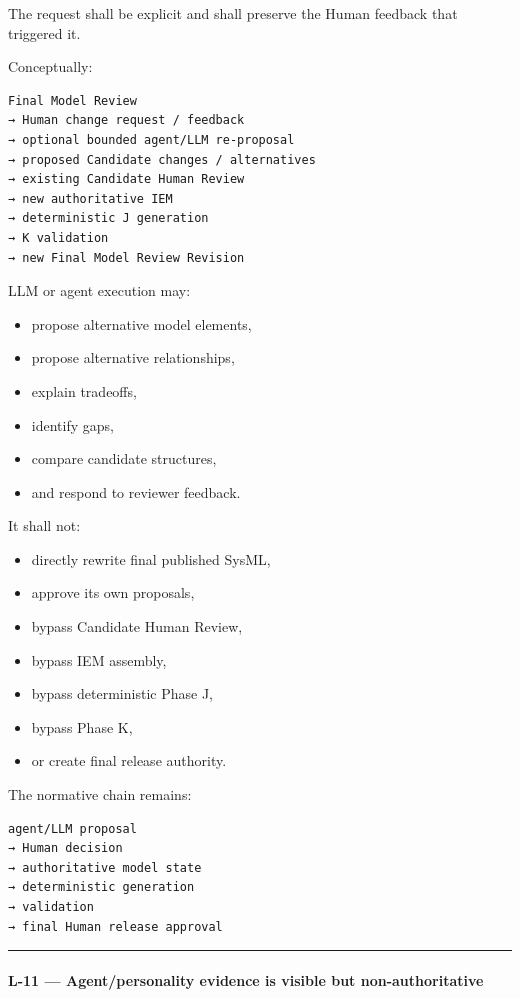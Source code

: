 The request shall be explicit and shall preserve the Human feedback that triggered it.

Conceptually:

\begin{verbatim}
Final Model Review
→ Human change request / feedback
→ optional bounded agent/LLM re-proposal
→ proposed Candidate changes / alternatives
→ existing Candidate Human Review
→ new authoritative IEM
→ deterministic J generation
→ K validation
→ new Final Model Review Revision
\end{verbatim}

LLM or agent execution may:

\begin{itemize}
\tightlist
\item
  propose alternative model elements,
\item
  propose alternative relationships,
\item
  explain tradeoffs,
\item
  identify gaps,
\item
  compare candidate structures,
\item
  and respond to reviewer feedback.
\end{itemize}

It shall not:

\begin{itemize}
\tightlist
\item
  directly rewrite final published SysML,
\item
  approve its own proposals,
\item
  bypass Candidate Human Review,
\item
  bypass IEM assembly,
\item
  bypass deterministic Phase J,
\item
  bypass Phase K,
\item
  or create final release authority.
\end{itemize}

The normative chain remains:

\begin{verbatim}
agent/LLM proposal
→ Human decision
→ authoritative model state
→ deterministic generation
→ validation
→ final Human release approval
\end{verbatim}

\begin{center}\rule{0.5\linewidth}{0.5pt}\end{center}

\hypertarget{l-11--agentpersonality-evidence-is-visible-but-non-authoritative}{%
\paragraph{L-11 --- Agent/personality evidence is visible but non-authoritative}\label{l-11--agentpersonality-evidence-is-visible-but-non-authoritative}}

